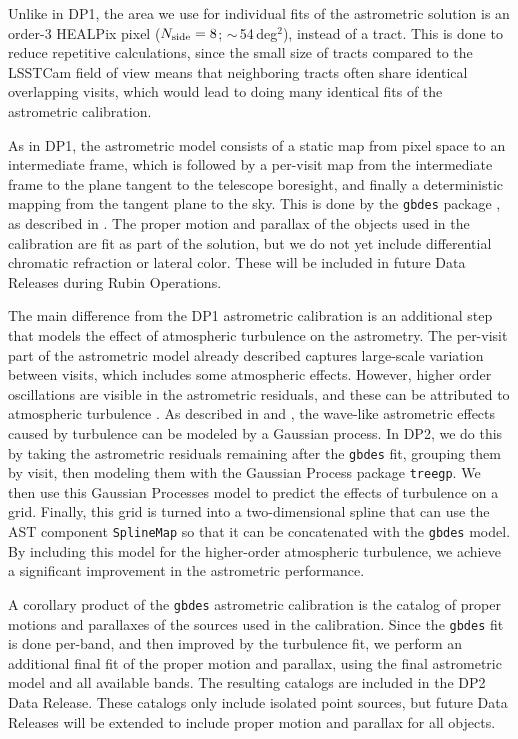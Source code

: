 Unlike in \gls{DP1}, the area we use for individual fits of the astrometric solution is an order-3 \gls{HEALPix} pixel ($N_{\rm side} = 8$; $\sim$\,54\,deg$^2$), instead of a \gls{tract}.
This is done to reduce repetitive calculations, since the small size of tracts compared to the \gls{LSSTCam} field of view means that neighboring tracts often share identical overlapping visits, which would lead to doing many identical fits of the astrometric calibration.

As in \gls{DP1}, the astrometric model consists of a static map from pixel space to an intermediate frame, which is followed by a per-visit map from the intermediate frame to the plane tangent to the telescope boresight, and finally a deterministic mapping from the tangent plane to the sky.
This is done by the \texttt{gbdes} package \citep[][]{2017PASP..129g4503B}, as described in \citet[][]{DMTN-266}.
The proper motion and parallax of the objects used in the \gls{calibration} are fit as part of the solution, but we do not yet include differential chromatic refraction or lateral color.
These will be included in future Data Releases during \gls{Rubin Operations}.

The main difference from the DP1 astrometric \gls{calibration} is an additional step that models the effect of atmospheric turbulence on the astrometry.
The per-visit part of the astrometric model already described captures large-scale variation between visits, which includes some atmospheric effects.
However, higher order oscillations are visible in the astrometric residuals, and these can be attributed to atmospheric turbulence \citep[][]{DMTN-324}.
As described in \citet[][]{2021AJ....162..106F} and \citet[][]{2021A&A...650A..81L}, the wave-like astrometric effects caused by turbulence can be modeled by a Gaussian process.
In \gls{DP2}, we do this by taking the astrometric residuals remaining after the \texttt{gbdes} fit, grouping them by visit, then modeling them with the Gaussian Process package \texttt{treegp}.
We then use this Gaussian Processes model to predict the effects of turbulence on a grid.
Finally, this grid is turned into a two-dimensional spline that can use the \gls{AST} component \texttt{SplineMap} so that it can be concatenated with the \texttt{gbdes} model.
By including this model for the higher-order atmospheric turbulence, we achieve a significant improvement in the astrometric performance.

A corollary product of the \texttt{gbdes} astrometric \gls{calibration} is the catalog of proper motions and parallaxes of the sources used in the \gls{calibration}.
Since the \texttt{gbdes} fit is done per-band, and then improved by the turbulence fit, we perform an additional final fit of the proper motion and parallax, using the final astrometric model and all available bands.
The resulting catalogs are included in the \gls{DP2} \gls{Data Release}.
These catalogs only include isolated point sources, but future Data Releases will be extended to include proper motion and parallax for all objects.

